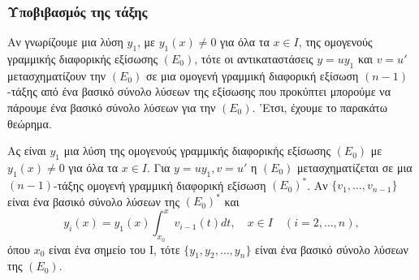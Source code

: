 \documentclass[11pt,a4paper,twoside]{book}
\newcommand{\titlefont}[1]{{\fontfamily{maksf}\selectfont #1}}
\newcounter{thewrhma}[chapter]
\renewcommand{\thethewrhma}{\thechapter.\arabic{thewrhma}}
\newcommand{\thewr}{\refstepcounter{thewrhma}{\bf\titlefont{\textcolor{secondarycolor}{\large Θεώρημα\hspace{2mm}\thethewrhma}}}\hspace{1mm}}{}
\newenvironment{Thewrhma}[1]
{\begin{tcolorbox}[title=\thewr\ \ :\ \  {\textcolor{black}{\bf{\large\titlefont{#1}}}},
breakable,
enhanced standard,
titlerule=-.2pt,
toprule=0pt, 
rightrule=0pt, 
bottomrule=0pt,
colback=white,
left=2mm,
top=1mm,
bottom=0mm,
boxrule=0pt,
colframe=white,
borderline west={1.5mm}{0pt}{secondarycolor},
leftrule=2mm,
sharp corners,
coltitle=secondarycolor]}
{\end{tcolorbox}}
\begin{document}
\subsubsection{Υποβιβασμός της τάξης}
Αν γνωρίζουμε μια λύση $y_1$, με $y_1(x) \ne 0$ για όλα τα $x \in I$, της ομογενούς γραμμικής διαφορικής εξίσωσης $(E_0)$, τότε οι αντικαταστάσεις $y=uy_1$ και $v=u'$ μετασχηματίζουν την $(E_0)$ σε μια ομογενή γραμμική διαφορική εξίσωση $(n-1)$-τάξης από ένα βασικό σύνολο λύσεων της εξίσωσης που προκύπτει μπορούμε να πάρουμε ένα βασικό σύνολο λύσεων για την $(E_0)$. 'Ετσι, έχουμε το παρακάτω θεώρημα.

\begin{Thewrhma}{9}
Ας είναι $y_1$ μια λύση της ομογενούς γραμμικής διαφορικής εξίσωσης $(E_0)$ με $y_1(x) \ne 0$ για όλα τα $x \in I$. Για $y=uy_1, v=u'$ η $(E_0)$ μετασχηματίζεται σε μια $(n-1)$-τάξης ομογενή γραμμική διαφορική εξίσωση $(E_0)^*$. Αν $\{v_1, \dots, v_{n-1}\}$ είναι ένα βασικό σύνολο λύσεων της $(E_0)^*$ και
\[
    y_i(x) = y_1(x) \int_{x_0}^x v_{i-1}(t) dt, \quad x \in I \quad (i=2, \dots, n),
\]
όπου $x_0$ είναι ένα σημείο του Ι, τότε $\{y_1, y_2, \dots, y_n\}$ είναι ένα βασικό σύνολο λύσεων της $(E_0)$.
\end{Thewrhma}
\end{document}
